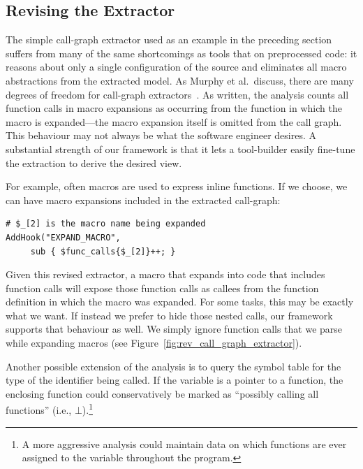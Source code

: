 \documentclass{article}
\newcommand{\ie}{i.e.,}
\begin{document}
\subsection{Revising the Extractor}
\label{sec:call_graph_revised}
The simple call-graph extractor used as an example in the preceding
section suffers from many of the same shortcomings as tools that
 on preprocessed code: it reasons about only a single
configuration of the source and eliminates all macro abstractions
from the extracted model.  As Murphy et al.\ discuss, there are many
degrees of freedom for call-graph extractors~\cite{Murphy98}.  As
written, the analysis counts all function calls in macro expansions as
occurring from the function in which the macro is expanded---the macro
expansion itself is omitted from the call graph.  This behaviour may not 
always be what the software engineer desires. A substantial
strength of our framework is that it lets a tool-builder easily
fine-tune the extraction to derive the desired view.

For example, often macros are used to express inline functions.  If we
choose, we can have macro expansions included in the extracted
call-graph:

\begin{verbatim}
# $_[2] is the macro name being expanded
AddHook("EXPAND_MACRO", 
     sub { $func_calls{$_[2]}++; }
\end{verbatim}

\noindent Given this revised extractor, a macro that expands into code
that includes function calls will expose those function calls as callees
from the function definition in which the macro was expanded.  For some
tasks, this may be exactly what we want.  If instead we prefer to hide
those nested calls, our framework supports that behaviour as well.  We
simply ignore function calls that we parse while expanding macros (see
Figure~\ref{fig:rev_call_graph_extractor}).

Another possible extension of the analysis is to query the symbol table
for the type of the identifier being called.  If the variable is a
pointer to a function, the enclosing function could conservatively be
marked as ``possibly calling all functions'' (\ie{} $\bot$).\footnote{A more
aggressive analysis could maintain data on which functions
are ever assigned to the variable throughout the program.}
\end{document}
